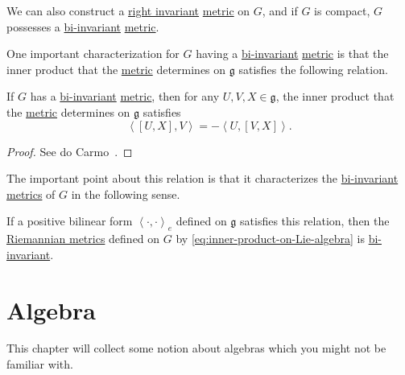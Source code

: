\begin{remark}
	We can also construct a \hyperref[def:Riemannian-metric-right-invariant]{right invariant} \hyperref[def:Riemannian-metric]{metric} on \(G\), and if \(G\) is compact, \(G\) possesses a \hyperref[def:Riemannian-metric-left-invariant]{bi-invariant} \hyperref[def:Riemannian-metric]{metric}.
\end{remark}

One important characterization for \(G\) having a \hyperref[def:Riemannian-metric-left-invariant]{bi-invariant} \hyperref[def:Riemannian-metric]{metric} is that the inner product that the \hyperref[def:Riemannian-metric]{metric} determines on \(\mathfrak{g} \) satisfies the following relation.

\begin{proposition}
	If \(G\) has a \hyperref[def:Riemannian-metric-left-invariant]{bi-invariant} \hyperref[def:Riemannian-metric]{metric}, then for any \(U, V, X\in \mathfrak{g} \), the inner product that the \hyperref[def:Riemannian-metric]{metric} determines on \(\mathfrak{g} \) satisfies
	\[
		\left\langle [U, X], V \right\rangle = -\left\langle U, [V, X] \right\rangle.
	\]
\end{proposition}
\begin{proof}
	See do Carmo~\cite[Page 40, 41]{flaherty2013riemannian}.
\end{proof}

The important point about this relation is that it characterizes the \hyperref[def:Riemannian-metric-left-invariant]{bi-invariant} \hyperref[def:Riemannian-metric]{metrics} of \(G\) in the following sense.

\begin{remark}
	If a positive bilinear form \(\left\langle \cdot, \cdot \right\rangle _e \) defined on \(\mathfrak{g} \) satisfies this relation, then the \hyperref[def:Riemannian-metric]{Riemannian metrics} defined on \(G\) by \autoref{eq:inner-product-on-Lie-algebra} is \hyperref[def:Riemannian-metric-left-invariant]{bi-invariant}.
\end{remark}

\chapter{Algebra}\label{ch:Algebra}
This chapter will collect some notion about algebras which you might not be familiar with.

